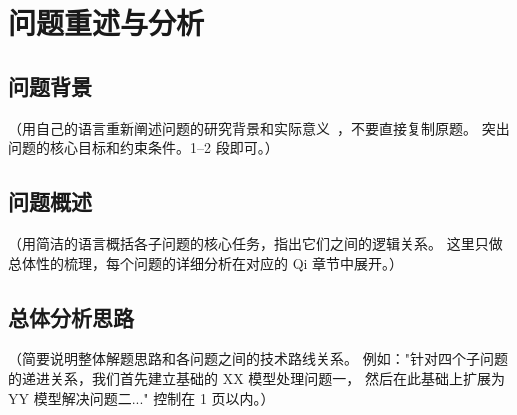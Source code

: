 \section{问题重述与分析}

\subsection{问题背景}

（用自己的语言重新阐述问题的研究背景和实际意义~\cite{example2024}，不要直接复制原题。
突出问题的核心目标和约束条件。1--2 段即可。）

\subsection{问题概述}

（用简洁的语言概括各子问题的核心任务，指出它们之间的逻辑关系。
这里只做总体性的梳理，每个问题的详细分析在对应的 Qi 章节中展开。）

\subsection{总体分析思路}

（简要说明整体解题思路和各问题之间的技术路线关系。
例如："针对四个子问题的递进关系，我们首先建立基础的 XX 模型处理问题一，
然后在此基础上扩展为 YY 模型解决问题二..."
控制在 1 页以内。）
